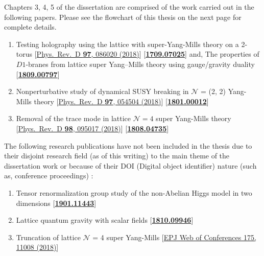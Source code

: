 \vspace*{2em}

\noindent Chapters 3, 4, 5 of the dissertation are comprised of the work carried out in the following papers. 
Please see the flowchart of this thesis on the next page for complete details. 

\begin{enumerate}

\item Testing holography using the lattice with super-Yang-Mills theory on a 2-torus [\href{https://journals.aps.org/prd/abstract/10.1103/PhysRevD.97.086020}{Phys.\ Rev.\ D {\bf 97}, 086020 (2018)}] [\textbf{\textcolor{blue}{\href{https://arxiv.org/abs/1709.07025}{1709.07025}}}]   and,  The properties of $D1$-branes from lattice super Yang--Mills theory using gauge/gravity duality   [\textbf{\textcolor{blue}{\href{https://arxiv.org/abs/1809.00797}{1809.00797}}}] 
 \item Nonperturbative study of dynamical SUSY breaking in $\mathcal{N}$ = (2, 2) Yang-Mills theory  [\href{https://journals.aps.org/prd/abstract/10.1103/PhysRevD.97.054504}{Phys.\ Rev.\ D {\bf 97}, 054504 (2018)}] [\textbf{\textcolor{blue}{\href{https://arxiv.org/abs/1801.00012}{1801.00012}}}]   
\item  Removal of the trace mode in lattice $\mathcal{N }= 4$ super Yang-Mills theory [\href{https://journals.aps.org/prd/abstract/10.1103/PhysRevD.98.095017}{Phys.\ Rev.\ D {\bf 98}, 095017 (2018)}] [\textbf{\textcolor{blue}{\href{https://arxiv.org/abs/1808.04735}{1808.04735}}}] 
\end{enumerate}

\vspace{10mm} 
The following research publications have not been included in the thesis due to their disjoint research field (as of this writing) to the main theme of the dissertation work or 
because of their DOI (Digital object identifier) nature (such as, conference proceedings) :

\begin{enumerate}
\item Tensor renormalization group study of the non-Abelian Higgs model in two dimensions [\textbf{\textcolor{blue}{\href{https://arxiv.org/abs/1901.11443}{1901.11443}}}]  
 \item  Lattice quantum gravity with scalar fields [\textbf{\textcolor{blue}{\href{https://arxiv.org/abs/1810.09946}{1810.09946}}}]
  \item Truncation of lattice $\mathcal{N}$ = 4 super Yang-Mills [\href{https://doi.org/10.1051/epjconf/201817511008}{EPJ Web of Conferences 175, 11008 (2018)}]
   \end{enumerate}

